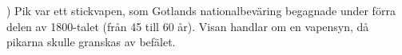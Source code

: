 \vspace{5mm}
) Pik var ett stickvapen, som Gotlands nationalbeväring
begagnade under förra delen av 1800-talet (från 45 till 60 år).
Visan handlar om en vapensyn, då pikarna skulle granskas av befälet.